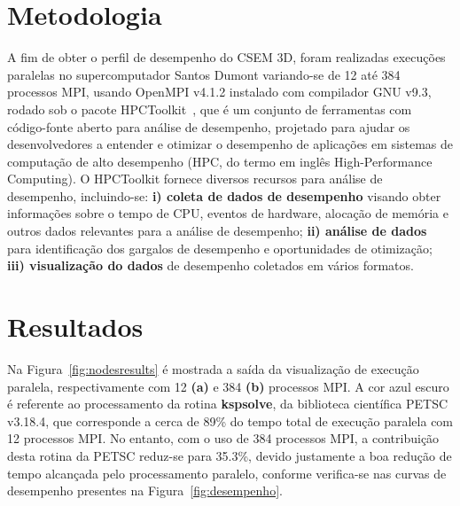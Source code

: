 \documentclass[12pt]{article}
\begin{document}
\section{Metodologia}
\label{sec:metodo}
%
A fim de obter o perfil de desempenho do CSEM 3D, foram realizadas execuções paralelas no supercomputador Santos Dumont variando-se de 12 até 384 processos MPI, usando OpenMPI v4.1.2 instalado com compilador GNU v9.3, rodado sob o pacote HPCToolkit~\cite{hpctoolkit2010}, que é um conjunto de ferramentas com código-fonte aberto para análise de desempenho, projetado para ajudar os desenvolvedores a entender e otimizar o desempenho de aplicações em sistemas de computação de alto desempenho (HPC, do termo em inglês High-Performance Computing). O HPCToolkit fornece diversos recursos para análise de desempenho, incluindo-se: \textbf{i) coleta de dados de desempenho} visando obter informações sobre o tempo de CPU, eventos de hardware, alocação de memória e outros dados relevantes para a análise de desempenho; \textbf{ii) análise de dados} para identificação dos gargalos de desempenho e oportunidades de otimização; \textbf{iii) visualização do dados} de desempenho coletados em vários formatos.


\section{Resultados}              
\label{sec:resultados}
Na Figura~\ref{fig:nodesresults} é mostrada a saída da visualização de execução paralela, respectivamente com 12 \textbf{(a)} e 384 \textbf{(b)} processos MPI. A cor azul escuro é referente ao processamento da rotina {\ttfamily \textbf{kspsolve}}, da biblioteca científica PETSC v3.18.4\cite{petsc-web-page,petsc-efficient}, que corresponde a cerca de 89\% do tempo total de execução paralela com 12 processos MPI. No entanto, com o uso de 384 processos MPI, a contribuição desta rotina da PETSC reduz-se para 35.3\%, devido justamente a boa redução de tempo alcançada pelo processamento paralelo, conforme verifica-se nas curvas de desempenho presentes na Figura~\ref{fig:desempenho}. 
\end{document}
